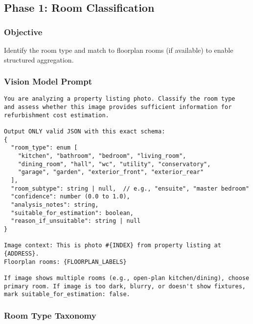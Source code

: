 \documentclass[11pt,a4paper]{article}
\begin{document}
\subsection{Phase 1: Room Classification}

\subsubsection{Objective}

Identify the room type and match to floorplan rooms (if available) to enable structured aggregation.

\subsubsection{Vision Model Prompt}

\begin{lstlisting}[caption=Room Classification Prompt Template]
You are analyzing a property listing photo. Classify the room type
and assess whether this image provides sufficient information for
refurbishment cost estimation.

Output ONLY valid JSON with this exact schema:
{
  "room_type": enum [
    "kitchen", "bathroom", "bedroom", "living_room",
    "dining_room", "hall", "wc", "utility", "conservatory",
    "garage", "garden", "exterior_front", "exterior_rear"
  ],
  "room_subtype": string | null,  // e.g., "ensuite", "master bedroom"
  "confidence": number (0.0 to 1.0),
  "analysis_notes": string,
  "suitable_for_estimation": boolean,
  "reason_if_unsuitable": string | null
}

Image context: This is photo #{INDEX} from property listing at {ADDRESS}.
Floorplan rooms: {FLOORPLAN_LABELS}

If image shows multiple rooms (e.g., open-plan kitchen/dining), choose
primary room. If image is too dark, blurry, or doesn't show fixtures,
mark suitable_for_estimation: false.
\end{lstlisting}

\subsubsection{Room Type Taxonomy}
\end{document}
